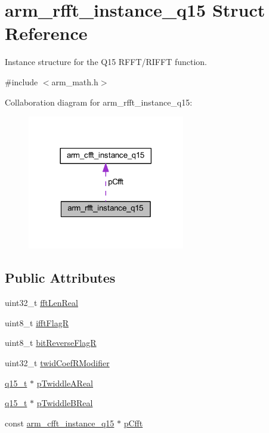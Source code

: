 \hypertarget{structarm__rfft__instance__q15}{}\section{arm\+\_\+rfft\+\_\+instance\+\_\+q15 Struct Reference}
\label{structarm__rfft__instance__q15}


Instance structure for the Q15 R\+F\+F\+T/\+R\+I\+F\+FT function.  




{\ttfamily \#include $<$arm\+\_\+math.\+h$>$}



Collaboration diagram for arm\+\_\+rfft\+\_\+instance\+\_\+q15\+:
\nopagebreak
\begin{figure}[H]
\begin{center}
\leavevmode
\includegraphics[width=194pt]{structarm__rfft__instance__q15__coll__graph}
\end{center}
\end{figure}
\subsection*{Public Attributes}
\begin{DoxyCompactItemize}
\item 
uint32\+\_\+t \hyperlink{structarm__rfft__instance__q15_aac5cf9e825917cbb14f439e56bb86ab3}{fft\+Len\+Real}
\item 
uint8\+\_\+t \hyperlink{structarm__rfft__instance__q15_a8051ffe268c147e431e1bea7bb4c4258}{ifft\+FlagR}
\item 
uint8\+\_\+t \hyperlink{structarm__rfft__instance__q15_a4c65cd40e0098ec2f5c0dc31488b9bc6}{bit\+Reverse\+FlagR}
\item 
uint32\+\_\+t \hyperlink{structarm__rfft__instance__q15_afd444d05858c5f419980e94e8240d5c3}{twid\+Coef\+R\+Modifier}
\item 
\hyperlink{arm__math_8h_ab5a8fb21a5b3b983d5f54f31614052ea}{q15\+\_\+t} $\ast$ \hyperlink{structarm__rfft__instance__q15_affbf2de522ac029432d98e8373c0ec53}{p\+Twiddle\+A\+Real}
\item 
\hyperlink{arm__math_8h_ab5a8fb21a5b3b983d5f54f31614052ea}{q15\+\_\+t} $\ast$ \hyperlink{structarm__rfft__instance__q15_a937d815022adc557b435ba8c6cd58b0d}{p\+Twiddle\+B\+Real}
\item 
const \hyperlink{structarm__cfft__instance__q15}{arm\+\_\+cfft\+\_\+instance\+\_\+q15} $\ast$ \hyperlink{structarm__rfft__instance__q15_a4329c15b056444746d37ff082a24d31a}{p\+Cfft}
\end{DoxyCompactItemize}


